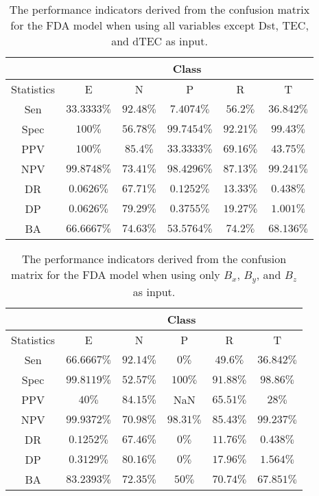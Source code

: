 \begin{table}[!ht]
	\centering
	\begin{tabular}{|c|c|c|c|c|c|}
		\hline
		 & \multicolumn{5}{c|}{Class} \\ \hline
		Statistics & E & N & P & R & T \\ \hline
		Sen & $33.3333\%$ & $92.48\%$ & $7.4074\%$ & $56.2\%$ & $36.842\%$ \\ \hline
		Spec & $100\%$ & $56.78\%$ & $99.7454\%$ & $92.21\%$ & $99.43\%$ \\ \hline
		PPV & $100\%$ & $85.4\%$ & $33.3333\%$ & $69.16\%$ & $43.75\%$ \\ \hline
		NPV & $99.8748\%$ & $73.41\%$ & $98.4296\%$ & $87.13\%$ & $99.241\%$ \\ \hline
		DR & $0.0626\%$ & $67.71\%$ & $0.1252\%$ & $13.33\%$ & $0.438\%$ \\ \hline
		DP & $0.0626\%$ & $79.29\%$ & $0.3755\%$ & $19.27\%$ & $1.001\%$ \\ \hline
		BA & $66.6667\%$ & $74.63\%$ & $53.5764\%$ & $74.2\%$ & $68.136\%$ \\ \hline
	\end{tabular}
	\caption{The performance indicators derived from the confusion matrix for the FDA model when using all variables except Dst, TEC, and dTEC as input.}
	\label{tab:cs:reverse:noTEC:fda}
\end{table}

\begin{table}[!ht]
	\centering
	\begin{tabular}{|c|c|c|c|c|c|}
		\hline
		 & \multicolumn{5}{c|}{Class} \\ \hline
		Statistics & E & N & P & R & T \\ \hline
		Sen & $66.6667\%$ & $92.14\%$ & $0\%$ & $49.6\%$ & $36.842\%$ \\ \hline
		Spec & $99.8119\%$ & $52.57\%$ & $100\%$ & $91.88\%$ & $98.86\%$ \\ \hline
		PPV & $40\%$ & $84.15\%$ & NaN & $65.51\%$ & $28\%$ \\ \hline
		NPV & $99.9372\%$ & $70.98\%$ & $98.31\%$ & $85.43\%$ & $99.237\%$ \\ \hline
		DR & $0.1252\%$ & $67.46\%$ & $0\%$ & $11.76\%$ & $0.438\%$ \\ \hline
		DP & $0.3129\%$ & $80.16\%$ & $0\%$ & $17.96\%$ & $1.564\%$ \\ \hline
		BA & $83.2393\%$ & $72.35\%$ & $50\%$ & $70.74\%$ & $67.851\%$ \\ \hline
	\end{tabular}
	\caption{The performance indicators derived from the confusion matrix for the FDA model when using only $B_{x}$, $B_{y}$, and $B_{z}$ as input.}
	\label{tab:cs:reverse:coord:fda}
\end{table}

